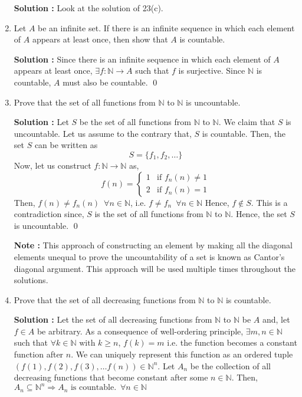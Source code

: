 \documentclass[10pt]{article}
\newcommand{\nn}{\mathbb{N}}
\begin{document}
\begin{enumerate}
	    \textbf{Solution : } Look at the solution of 23(c).
    \item Let $A$ be an infinite set. If there is an infinite sequence in which each element of $A$ appears at least once, then show that $A$ is countable.
    
    \textbf{Solution : } Since there is an infinite sequence in which each element of $A$ appears at least once, $\exists f : \nn \to A$ such that $f$ is surjective. Since $\nn$ is countable, $A$ must also be countable. \qed    
    \item Prove that the set of all functions from $\nn$ to $\nn$ is uncountable.

    \textbf{Solution : }Let $S$ be the set of all functions from $\nn$ to $\nn$. We claim that $S$ is uncountable. Let us assume to the contrary that, $S$ is countable. Then, the set $S$ can be written as $$S = \{f_1, f_2, \dots \}$$ Now, let us construct $f : \nn \to \nn$ as, 
    \begin{equation*}
        f(n) = 
        \begin{cases}
            1 & \text{if } f_n(n) \neq 1 \\
            2 & \text{if } f_n(n) = 1
        \end{cases}
    \end{equation*}
    Then, $f(n) \neq f_n(n) \,\,\, \forall n \in \nn$, i.e. $f \neq f_n \,\,\, \forall n \in \nn$ Hence, $f \notin S$. This is a contradiction since, $S$ is the set of all functions from $\nn$ to $\nn$. Hence, the set $S$ is uncountable. \qed

    \textbf{Note : }This approach of constructing an element by making all the diagonal elements unequal  to prove the uncountability of a set is known as 
    Cantor's diagonal argument. This approach will be used multiple times throughout the solutions.
    \item Prove that the set of all decreasing functions from $\nn$ to $\nn$ is countable.

	    \textbf{ Solution : }Let the set of all decreasing functions from $\nn$ to $\nn$ be $A$ and, let $f \in A$ be arbitrary.
	    As a consequence of well-ordering principle, $\exists m,n \in \nn$ such that $\forall k \in \nn \text{ with }k \geq n$, 
	    $f(k) = m$ i.e. the function becomes a constant function after $n$. We can uniquely
	    represent this function as an ordered tuple $(f(1), f(2), f(3), \dots f(n)) \in \nn^n$.
	    Let $A_n$ be the collection of all decreasing functions that become constant after some $n \in \nn$. Then, $A_n \subseteq \nn^n \Rightarrow A_n \text{ is countable.} \,\,\, \forall n \in \nn$


\end{enumerate}
\end{document}
